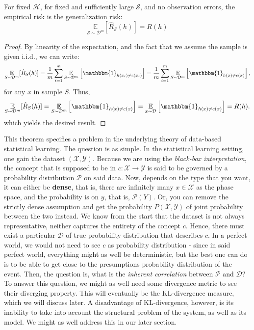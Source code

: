 \begin{theorem}\label{thm:minimalNeu}
    For fixed $\mathcal{H}$, for fixed and sufficiently large $\mathcal{S}$, and no observation errors, the empirical risk is the generalization risk: \begin{equation}
        \underset{\mathcal{S}\sim \mathcal{D}^{m}}{\mathbb{E}}[\hat{R}_{\mathcal{S}}(h)]  = R(h)
    \end{equation} 
\end{theorem}
\begin{proof}
    By linearity of the expectation, and the fact that we assume the sample is given i.i.d., we can write: 
\[
\underset{S \sim \mathcal{D}^m}{\mathbb{E}}[\hat{R}_S(h)] 
= \frac{1}{m} \sum_{i=1}^m 
\underset{S \sim \mathcal{D}^m}{\mathbb{E}} 
\left[ \mathbbm{1}_{h(x_i) \ne c(x_i)} \right] 
= \frac{1}{m} \sum_{i=1}^m 
\underset{S \sim \mathcal{D}^m}{\mathbb{E}} 
\left[ \mathbbm{1}_{h(x) \ne c(x)} \right],
\]
for any \( x \) in sample \( S \). Thus,
\[
\underset{S \sim \mathcal{D}^m}{\mathbb{E}}[\hat{R}_S(h)] 
= \underset{S \sim \mathcal{D}^m}{\mathbb{E}} 
\left[ \mathbbm{1}_{h(x) \ne c(x)} \right] 
= \underset{x \sim \mathcal{D}}{\mathbb{E}} 
\left[ \mathbbm{1}_{h(x) \ne c(x)} \right] 
= R(h).
\]
which yields the desired result. 
\end{proof}

This theorem specifies a problem in the underlying theory of data-based statistical learning. The question is as simple. In the statistical learning setting, one gain the dataset $(\mathcal{X},\mathcal{Y})$. Because we are using the \textit{black-box interpretation}, the concept that is supposed to be in $c: \mathcal{X}\to \mathcal{Y}$ is said to be governed by a probability distribution $\mathcal{P}$ on said data. Now, depends on the type that you want, it can either be \textbf{dense}, that is, there are infinitely many $x\in \mathcal{X}$ as the phase space, and the probability is on $y$, that is, $\mathcal{P}(Y)$. Or, you can remove the strictly dense assumption and get the probability $P(\mathcal{X},\mathcal{Y})$ of joint probability between the two instead. We know from the start that the dataset is not always representative, neither captures the entirety of the concept $c$. Hence, there must exist a particular $\mathcal{D}$ of true probability distribution that describes $c$. In a perfect world, we would not need to see $c$ as probability distribution - since in said perfect world, everything might as well be deterministic, but the best one can do is to be able to get close to the presumptions probability distribution of the event. Then, the question is, what is the \textit{inherent correlation} between $\mathcal{P}$ and $\mathcal{D}$? To answer this question, we might as well need some divergence metric to see their diverging property. This will eventually be the $\mathrm{KL}$-divergence measure, which we will discuss later. A disadvantage of $\mathrm{KL}$-divergence, however, is its inability to take into account the structural problem of the system, as well as its model. We might as well address this in our later section. 

